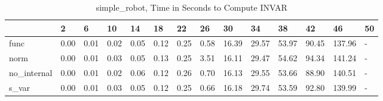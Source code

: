 \begin{table}
\caption{simple_robot, Time in Seconds to Compute INVAR}
\label{simple_robot_INVAR_time}
\begin{tabular}{llllllllllllll}
\toprule
 & 2 & 6 & 10 & 14 & 18 & 22 & 26 & 30 & 34 & 38 & 42 & 46 & 50 \\
\midrule
func & 0.00 & 0.01 & 0.02 & 0.05 & 0.12 & 0.25 & 0.58 & 16.39 & 29.57 & 53.97 & 90.45 & 137.96 & - \\
norm & 0.00 & 0.01 & 0.03 & 0.05 & 0.13 & 0.25 & 3.51 & 16.11 & 29.47 & 54.62 & 94.34 & 141.24 & - \\
no_internal & 0.00 & 0.01 & 0.02 & 0.06 & 0.12 & 0.26 & 0.70 & 16.13 & 29.55 & 53.66 & 88.90 & 140.51 & - \\
s_var & 0.00 & 0.01 & 0.03 & 0.05 & 0.12 & 0.25 & 0.66 & 16.18 & 29.74 & 53.59 & 92.80 & 139.99 & - \\
\bottomrule
\end{tabular}
\end{table}

